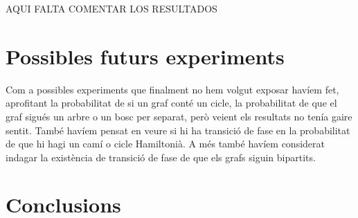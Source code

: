 AQUI FALTA COMENTAR LOS RESULTADOS

\section{Possibles futurs experiments}
Com a possibles experiments que finalment no hem volgut exposar havíem fet, aprofitant la probabilitat de si un graf conté un cicle, la probabilitat de que el graf sigués un arbre o un bosc per separat, però veient els resultats no tenía gaire sentit. També havíem pensat en veure si hi ha transició de fase en la probabilitat de que hi hagi un camí o cicle Hamiltonià. A més també havíem considerat indagar la existència de transició de fase de que els grafs siguin bipartits.

\section{Conclusions}

\pagebreak

\printbibliography


